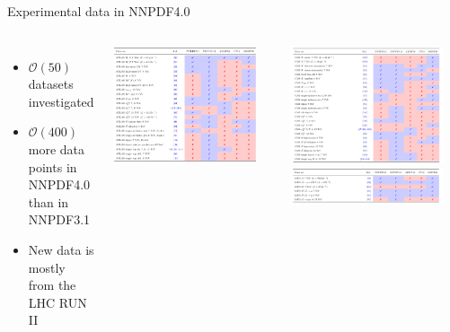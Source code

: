 \documentclass[aspectratio=169,9pt]{beamer}
\begin{document}
\begin{frame}{Experimental data in NNPDF4.0}
	\begin{columns}
	        {\footnotesize
	        \begin{itemize}
	            \item $\mathcal{O}(50)$ datasets investigated
	            \item $\mathcal{O}(400)$ more data points in NNPDF4.0 \\ than in NNPDF3.1
	            \item New data is mostly from the LHC RUN II
	        \end{itemize}
	        }
	        \includegraphics[width=0.9\textwidth]{atlas_data_table}
	
	        \includegraphics[width=0.9\textwidth]{cms_data_table} \\
	        \includegraphics[width=0.9\textwidth]{lhcb_data_table}
	\end{columns}
\end{frame}
\end{document}
